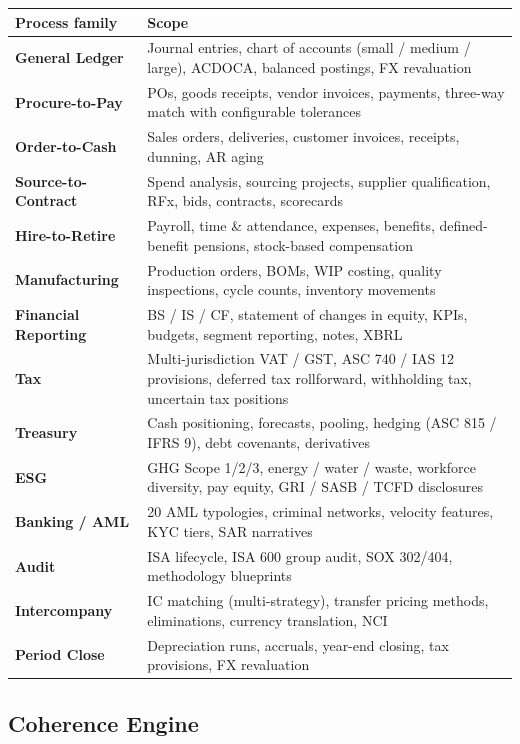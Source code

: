 \documentclass[11pt,a4paper]{article}
\begin{document}
\renewcommand{\arraystretch}{1.25}
\begin{tabularx}{\textwidth}{@{}>{\bfseries\color{brand}}l X@{}}
\toprule
\textbf{Process family} & \textbf{Scope} \\
\midrule
General Ledger      & Journal entries, chart of accounts (small / medium / large), ACDOCA, balanced postings, FX revaluation \\
Procure-to-Pay      & POs, goods receipts, vendor invoices, payments, three-way match with configurable tolerances \\
Order-to-Cash       & Sales orders, deliveries, customer invoices, receipts, dunning, AR aging \\
Source-to-Contract  & Spend analysis, sourcing projects, supplier qualification, RFx, bids, contracts, scorecards \\
Hire-to-Retire      & Payroll, time \& attendance, expenses, benefits, defined-benefit pensions, stock-based compensation \\
Manufacturing       & Production orders, BOMs, WIP costing, quality inspections, cycle counts, inventory movements \\
Financial Reporting & BS / IS / CF, statement of changes in equity, KPIs, budgets, segment reporting, notes, XBRL \\
Tax                 & Multi-jurisdiction VAT / GST, ASC 740 / IAS 12 provisions, deferred tax rollforward, withholding tax, uncertain tax positions \\
Treasury            & Cash positioning, forecasts, pooling, hedging (ASC 815 / IFRS 9), debt covenants, derivatives \\
ESG                 & GHG Scope 1/2/3, energy / water / waste, workforce diversity, pay equity, GRI / SASB / TCFD disclosures \\
Banking / AML       & 20 AML typologies, criminal networks, velocity features, KYC tiers, SAR narratives \\
Audit               & ISA lifecycle, ISA 600 group audit, SOX 302/404, methodology blueprints \\
Intercompany        & IC matching (multi-strategy), transfer pricing methods, eliminations, currency translation, NCI \\
Period Close        & Depreciation runs, accruals, year-end closing, tax provisions, FX revaluation \\
\bottomrule
\end{tabularx}

\subsection{Coherence Engine}
\end{document}

